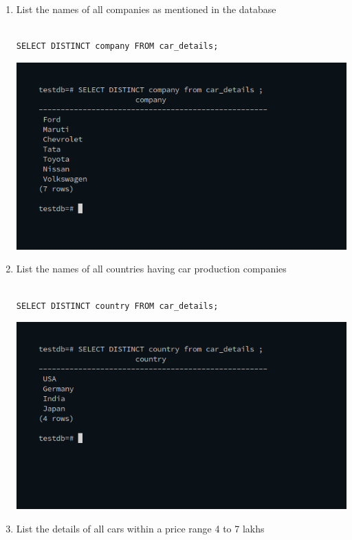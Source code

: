\begin{enumerate}
\item List the names of all companies as mentioned in the database\newline
\begin{verbatim}

SELECT DISTINCT company FROM car_details;

\end{verbatim}
\newline
\includegraphics[width=\linewidth]{../Images/Basics/13.png}\newline
\item List the names of all countries having car production companies\newline
\begin{verbatim}

SELECT DISTINCT country FROM car_details;

\end{verbatim}
\newline
\includegraphics[width=\linewidth]{../Images/Basics/14.png}\newline
\item List the details of all cars within a price range 4 to 7 lakhs\newline
\begin{verbatim}


\end{verbatim}
\end{enumerate}
